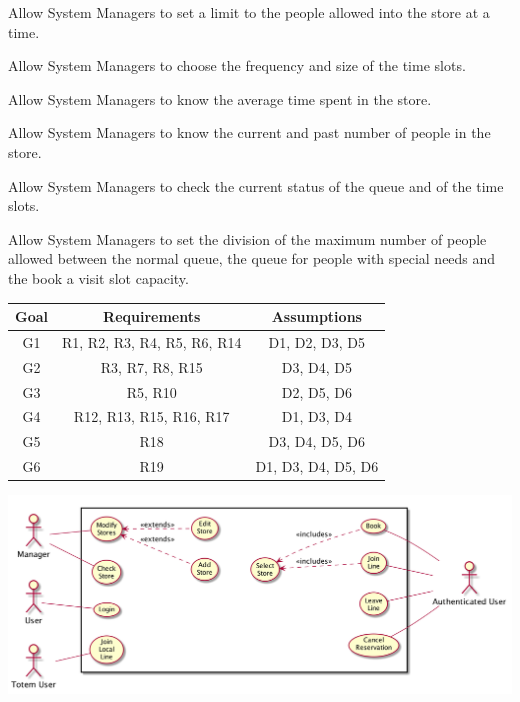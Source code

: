 \begin{enumerate}[label={[R\arabic*]}]
    \item Allow System Managers to set a limit to the people allowed into the store at a time.
    \item Allow System Managers to choose the frequency and size of the time slots.
    \item Allow System Managers to know the average time spent in the store.
    \item Allow System Managers to know the current and past number of people in the store.
    \item Allow System Managers to check the current status of the queue and of the time slots.
    \item Allow System Managers to set the division of the maximum number of people allowed between the normal queue, the queue for people with special needs and the book a visit slot capacity.
    
\end{enumerate}

\begin{center}
    \begin{tabular}{ |c||c|c| }
        \hline
        \textbf{Goal} & \textbf{Requirements} & \textbf{Assumptions} \\
        \hline
        G1 & R1, R2, R3, R4, R5, R6, R14 & D1, D2, D3, D5 \\ %
        \hline
        G2 & R3, R7, R8, R15 & D3, D4, D5 \\ %
        \hline
        G3 & R5, R10 & D2, D5, D6\\ %
        \hline
        G4 & R12, R13, R15, R16, R17 & D1, D3, D4 \\ %
        \hline
        G5 & R18 & D3, D4, D5, D6 \\ %
        \hline
        G6 & R19 & D1, D3, D4, D5, D6 \\ %
        \hline
    \end{tabular}
\end{center}

\begin{center}
    \includegraphics[width=\textwidth]{uml/usecase.png}
\end{center}


